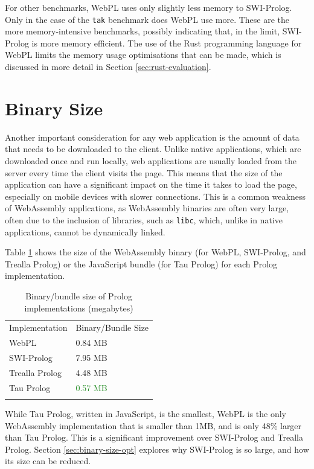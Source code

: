 For other benchmarks, WebPL uses only slightly less memory to SWI-Prolog. Only in the case of the \texttt{tak} benchmark does WebPL use more. These are the more memory-intensive benchmarks, possibly indicating that, in the limit, SWI-Prolog is more memory efficient. The use of the Rust programming language for WebPL limits the memory usage optimisations that can be made, which is discussed in more detail in Section \ref{sec:rust-evaluation}.

\section{Binary Size}

\label{sec:binary-size}

Another important consideration for any web application is the amount of data that needs to be downloaded to the client. Unlike native applications, which are downloaded once and run locally, web applications are usually loaded from the server every time the client visits the page. This means that the size of the application can have a significant impact on the time it takes to load the page, especially on mobile devices with slower connections. This is a common weakness of WebAssembly applications, as WebAssembly binaries are often very large, often due to the inclusion of libraries, such as \texttt{libc}, which, unlike in native applications, cannot be dynamically linked.

Table \ref{tab:binary-size} shows the size of the WebAssembly binary (for WebPL, SWI-Prolog, and Trealla Prolog) or the JavaScript bundle (for Tau Prolog) for each Prolog implementation.

\begin{table}[H]
\centering
\begin{tabular}{ll}
\addlinespace\hline\addlinespace
Implementation & Binary/Bundle Size \\
\addlinespace\hline\addlinespace
WebPL & 0.84 MB \\
SWI-Prolog & 7.95 MB \\
Trealla Prolog & 4.48 MB \\
Tau Prolog & \textcolor{ForestGreen}{0.57 MB} \\
\addlinespace\hline\addlinespace
\end{tabular}
\caption{Binary/bundle size of Prolog implementations (megabytes)}
\label{tab:binary-size}
\end{table}

While Tau Prolog, written in JavaScript, is the smallest, WebPL is the only WebAssembly implementation that is smaller than 1MB, and is only 48\% larger than Tau Prolog. This is a significant improvement over SWI-Prolog and Trealla Prolog. Section \ref{sec:binary-size-opt} explores why SWI-Prolog is so large, and how its size can be reduced.

